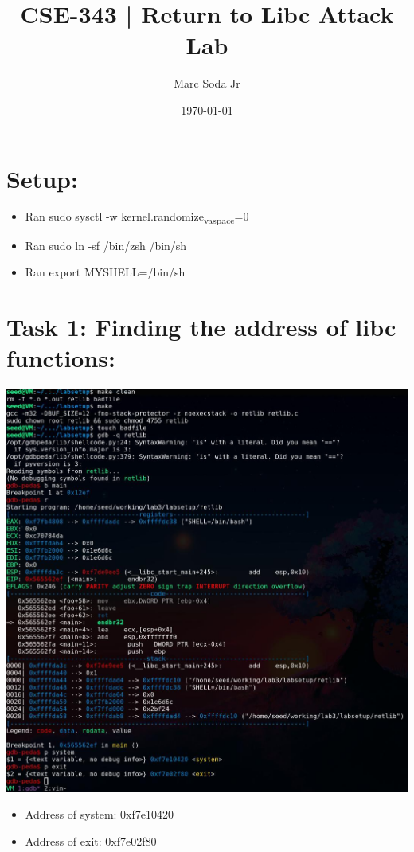 \documentclass[11pt]{article}
\author{Marc Soda Jr}
\date{\today}
\title{CSE-343 | Return to Libc Attack Lab}
\begin{document}
\maketitle
\tableofcontents

\section*{Setup:}
\label{sec:org1df65f8}
\begin{itemize}
\item Ran sudo sysctl -w kernel.randomize\textsubscript{va}\textsubscript{space}=0
\item Ran sudo ln -sf /bin/zsh /bin/sh
\item Ran export MYSHELL=/bin/sh
\end{itemize}
\section*{Task 1: Finding the address of libc functions:}
\label{sec:org58ca0e7}
\begin{center}
\includegraphics[width=.9\linewidth]{./images/0.jpg}
\end{center}
\begin{itemize}
\item Address of system: 0xf7e10420
\item Address of exit: 0xf7e02f80
\end{itemize}
\end{document}
